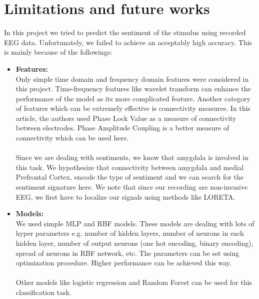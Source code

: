 \documentclass[]{article}
\begin{document}
	\section{Limitations and future works}
	In this project we tried to predict the sentiment of the stimulus using recorded EEG data. Unfortunately, we failed to achieve an acceptably high accuracy. This is mainly because of the followings:
	\begin{itemize}
		\item \textbf{Features:}\\
		Only simple time domain and frequency domain features were considered in this project. Time-frequency features like wavelet transform can enhance the performance of the model as its more complicated feature. Another category of features which can be extremely effective is connectivity measures. In this article, the authors used Phase Lock Value as a measure of connectivity between electrodes. Phase Amplitude Coupling is a better measure of connectivity which can be used here.\\\\
		Since we are dealing with sentiments, we know that amygdala is involved in this task. We hypothesize that connectivity between amygdala and medial Prefrontal Cortex, encode the type of sentiment and we can search for the sentiment signature here. We note that since our recording are non-invasive EEG, we first have to localize our signals using methods like LORETA.
		
		\item \textbf{Models:}\\
		We used simple MLP and RBF models. These models are dealing with lots of hyper parameters e.g. number of hidden layers, number of neurons in each hidden layer, number of output neurons (one hot encoding, binary encoding), spread of neurons in RBF network, etc. The parameters can be set using optimization procedure. Higher performance can be achieved this way.\\\\
		Other models like logistic regression and Random Forest can be used for this classification task.
	\end{itemize}
	
\end{document}
